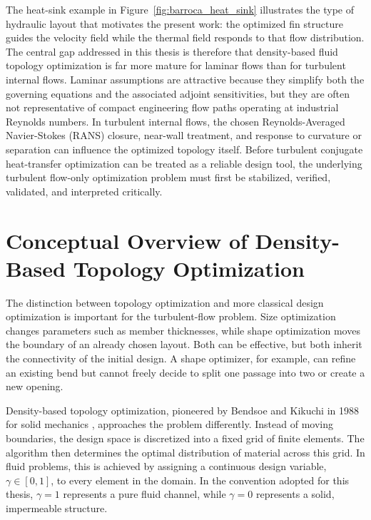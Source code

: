 The heat-sink example in Figure~\ref{fig:barroca_heat_sink} illustrates the type of hydraulic layout that motivates the present work: the optimized fin structure guides the velocity field while the thermal field responds to that flow distribution. The central gap addressed in this thesis is therefore that density-based fluid topology optimization is far more mature for laminar flows than for turbulent internal flows. Laminar assumptions are attractive because they simplify both the governing equations and the associated adjoint sensitivities, but they are often not representative of compact engineering flow paths operating at industrial Reynolds numbers. In turbulent internal flows, the chosen Reynolds-Averaged Navier-Stokes (RANS) closure, near-wall treatment, and response to curvature or separation can influence the optimized topology itself. Before turbulent conjugate heat-transfer optimization can be treated as a reliable design tool, the underlying turbulent flow-only optimization problem must first be stabilized, verified, validated, and interpreted critically.

\section{Conceptual Overview of Density-Based Topology Optimization}
The distinction between topology optimization and more classical design optimization is important for the turbulent-flow problem. Size optimization changes parameters such as member thicknesses, while shape optimization moves the boundary of an already chosen layout. Both can be effective, but both inherit the connectivity of the initial design. A shape optimizer, for example, can refine an existing bend but cannot freely decide to split one passage into two or create a new opening.

Density-based topology optimization, pioneered by Bendsoe and Kikuchi in 1988 for solid mechanics \cite{Bendsoe1988}, approaches the problem differently. Instead of moving boundaries, the design space is discretized into a fixed grid of finite elements. The algorithm then determines the optimal distribution of material across this grid. In fluid problems, this is achieved by assigning a continuous design variable, $\gamma \in [0, 1]$, to every element in the domain. In the convention adopted for this thesis, $\gamma = 1$ represents a pure fluid channel, while $\gamma = 0$ represents a solid, impermeable structure.


